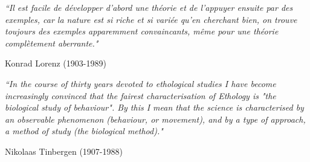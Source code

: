 \documentclass[11pt, oneside]{Thesis} %
\begin{document}
\textit{``Il est facile de développer d'abord une théorie et de l'appuyer ensuite par des exemples, car la nature est si riche et si variée qu'en cherchant bien, on trouve toujours des exemples apparemment convaincants, même pour une théorie complètement aberrante."}

\begin{flushright}
Konrad Lorenz (1903-1989)
\end{flushright}

\textit{``In the course of thirty years devoted to ethological studies I have become increasingly convinced that the fairest characterisation of Ethology is \textit{"the biological study of behaviour"}. By this I mean that the science is characterised by an observable phenomenon (behaviour, or movement), and by a type of approach, a method of study (the biological method)."}

\begin{flushright}
Nikolaas Tinbergen (1907-1988)
\end{flushright}



\vfill\vfill\vfill\vfill\vfill\vfill\null %



\cleardoublepage %


\end{document}
